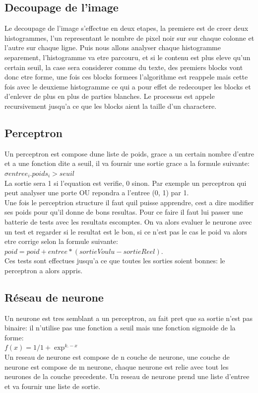 \documentclass{article}
\begin{document}
\subsection{Decoupage de l'image}
Le decoupage de l'image s'effectue en deux etapes, la premiere est de creer deux histogrammes, l'un representant le nombre de pixel noir sur sur chaque colonne et l'autre sur chaque ligne. Puis nous allons analyser chaque histogramme separement, l'histogramme va etre parcouru, et si le contenu est plus eleve qu'un certain seuil, la case sera considerer comme du texte, des premiers blocks vont donc etre forme, une fois ces blocks formees l'algorithme est reappele mais cette fois avec le deuxieme histogramme ce qui a pour effet de redecouper les blocks et d'enlever de plus en plus de parties blanches. Le processus est appele recursivement jusqu'a ce que les blocks aient la taille d'un charactere.


\subsection{Perceptron}
Un perceptron est compose dune liste de poids, grace a un certain nombre d'entre et a une fonction dite a seuil, il va fournir une sortie grace a la formule suivante:
\\
$\sigma entree_{i}.poids_{i} > seuil$
\\
 La sortie sera 1 si l'equation est verifie, 0 sinon. Par exemple un perceptron qui peut analyser une porte OU repondra a l'entree (0, 1) par 1.
\\
Une fois le perceptrion structure il faut quil puisse apprendre, cest a dire modifier ses poids pour qu'il donne de bons resultas. Pour ce faire il faut lui passer une batterie de tests avec les resultats escomptes. On va alors evaluer le neurone avec un test et regarder si le resultat est le bon, si ce n'est pas le cas le poid va alors etre corrige selon la formule suivante: 
\\
$poid = poid + entree*(sortieVoulu - sortieReel)$.
\\
 Ces tests sont effectues jusqu'a ce que toutes les sorties soient bonnes: le perceptron a alors appris.


\subsection{Réseau de neurone}
Un neurone est tres semblant a un perceptron, au fait pret que sa sortie n'est pas binaire: il n'utilise pas une fonction a seuil mais une fonction sigmoide de la forme:
\\
$f(x) = 1 / 1 + \exp ^{k.-x}$
\\
Un reseau de neurone est compose de n couche de neurone, une couche de neurone est compose de m neurone, chaque neurone est relie avec tout les neurones de la couche precedente. Un reseau de neurone prend une liste d'entree et va fournir une liste de sortie.
\newpage
\end{document}
